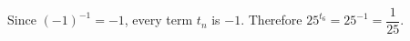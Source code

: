 Since $(-1)^{-1}=-1$, every term $t_n$ is $-1$. Therefore $25^{t_6}=25^{-1}=\boxed{\dfrac{1}{25}}$.
